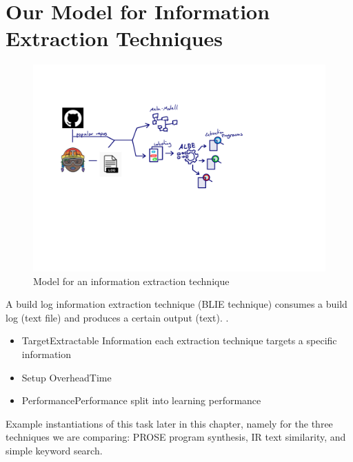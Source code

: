 \documentclass[\myrootdir/main.tex]{subfiles}
\begin{document}


\section{Our Model for Information Extraction Techniques}
\begin{figure}[h]
	\centering
	\includegraphics[page=3, width=\textwidth, trim={0.5cm 0.5cm 0.5cm 0.5cm}, clip]{img/flow-of-research.pdf}
	\caption{Model for an information extraction technique}
	\label{fig:model-ie-technique}
\end{figure}
A build log information extraction technique (BLIE technique) consumes a build log (text file) and produces a certain output (text). .
\begin{itemize}
	\item{Target}{Extractable Information} each extraction technique  targets a specific information
	\item{Setup Overhead}{Time}
	\item{Performance}{Performance} split into learning performance
\end{itemize}

Example instantiations of this task later in this chapter, namely for the three techniques we are comparing: PROSE program synthesis, IR text similarity, and simple keyword search. 
\end{document}
